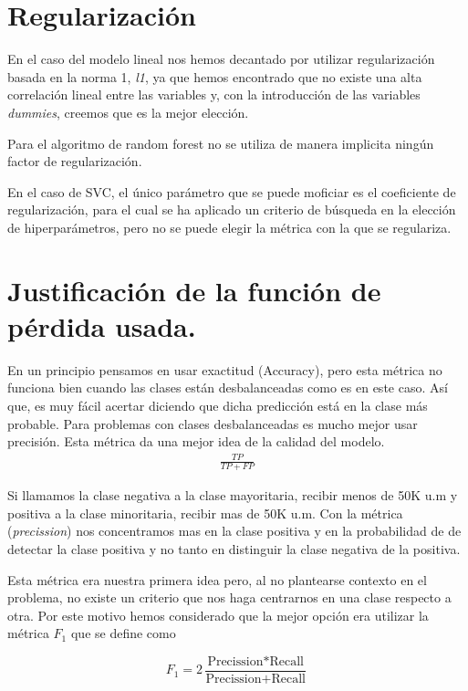 \documentclass[a4paper,11pt]{article}
\begin{document}
\section{Regularización}

En el caso del modelo lineal nos hemos decantado por utilizar regularización
basada en la norma 1, \textit{l1}, ya que hemos encontrado que no existe una
alta correlación lineal entre las variables y, con la introducción de las
variables \textit{dummies}, creemos que es la mejor elección. 

Para el algoritmo de random forest no se utiliza de manera implicita ningún
factor de regularización.

En el caso de SVC, el único parámetro que se puede moficiar es el coeficiente de
regularización, para el cual se ha aplicado un criterio de búsqueda en la
elección de hiperparámetros, pero no se puede elegir la métrica con la que se
regulariza.


\section{Justificación de la función de pérdida usada.}

En un principio pensamos en usar exactitud (Accuracy), pero esta métrica no
funciona bien cuando las clases están desbalanceadas como es en este caso. Así
que, es muy fácil acertar diciendo que dicha predicción está en la clase más
probable. Para problemas con clases desbalanceadas es mucho mejor usar
precisión. Esta métrica da una mejor idea de la calidad del modelo. 
\begin{align*}
\frac{TP}{TP+FP}
\end{align*}


Si llamamos la clase negativa a la clase mayoritaria, recibir menos de 50K u.m y
positiva a la clase minoritaria, recibir mas de 50K u.m. Con la métrica
(\textit{precission}) \cite{metrics} nos concentramos mas en la clase positiva y
en la probabilidad de de detectar la clase positiva y no tanto en distinguir la
clase negativa de la positiva.

Esta métrica era nuestra primera idea pero, al no plantearse contexto en el problema,
no existe un criterio que nos haga centrarnos en una clase respecto a otra. Por este 
motivo hemos considerado que la mejor opción era utilizar la métrica $F_1$ 
que se define como 

\[
    F_1 = 2\frac{\text{Precission} * \text{Recall}}{\text{Precission} + \text{Recall}} 
\]
\end{document}

